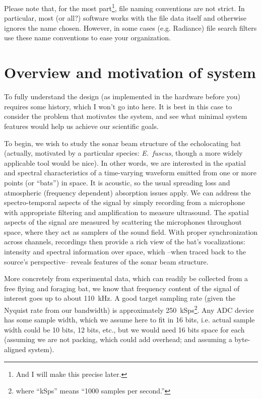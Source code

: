 \documentclass[letterpaper]{article}
\begin{document}
Please note that, for the most part\footnote{And I will make this
  precise later.}, file naming conventions are not strict. In
particular, most (or all?) software works with the file data itself
and otherwise ignores the name chosen.  However, in some cases
(e.g. Radiance) file search filters use these name conventions to ease
your organization.


\section{Overview and motivation of system}
\label{overview:sec}

To fully understand the design (as implemented in the hardware before
you) requires some history, which I won't go into here.  It is best in
this case to consider the problem that motivates the system, and see
what minimal system features would help us achieve our scientific
goals.

To begin, we wish to study the sonar beam structure of the
echolocating bat (actually, motivated by a particular species:
\textit{E.~fuscus}, though a more widely applicable tool would be
nice).  In other words, we are interested in the spatial and spectral
characteristics of a time-varying waveform emitted from one or more
points (or ``bats'') in space.  It is acoustic, so the usual spreading
loss and atmospheric (frequency dependent) absorption issues
apply. We can address the spectro-temporal aspects of the signal by simply
recording from a microphone with appropriate filtering and
amplification to measure ultrasound. The spatial aspects of the signal
are measured by scattering the microphones throughout space, where
they act as samplers of the sound field. With proper synchronization
across channels, recordings then provide a rich view of the bat's
vocalizations: intensity and spectral information over space, which
--when traced back to the source's perspective-- reveals features of
the sonar beam structure.

More concretely from experimental data, which can readily be collected
from a free flying and foraging bat, we know that frequency content of
the signal of interest goes up to about 110~kHz.  A good target
sampling rate (given the Nyquist rate from our bandwidth) is
approximately 250~kSps\footnote{where ``kSps'' means ``1000 samples
  per second.''}.  Any ADC device has some sample width, which we
assume here to fit in 16 bits, i.e. actual sample width could be 10
bits, 12 bits, etc., but we would need 16 bits space for each
(assuming we are not packing, which could add overhead; and assuming a
byte-aligned system).
\end{document}
